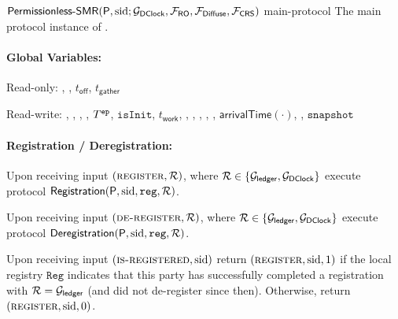 \begin{cccProtocol}
    {$\mathsf{Permissionless\text{-}SMR}(\mathsf{P}, \mathrm{sid}; \mathcal{G}_{\textsf{DClock}}, \mathcal{F}_{\textsf{RO}}, \mathcal{F}_{\textsf{Diffuse}}, \mathcal{F}_{\textsf{CRS}})$}
    {main-protocol}
    {The main protocol instance of \pSMR.}

    \paragraph{Global Variables:}
    \begin{cccItemize}[nosep]
        \item Read-only: \syncLen, \epochLen, $t_{\mathsf{off}}$, $t_{\mathsf{gather}}$

        \item Read-write: \localTime, \epoch, \parallelChainsLocal, \parallelTreesLocal, $T^{\mathtt{ep}}$, $\mathtt{isInit}$, $t_{\mathsf{work}}$, \buffer, , \futureChains, \isSync, \fetchCompleted, $\mathsf{arrivalTime}(\cdot)$, \state, $\mathtt{snapshot}$
    \end{cccItemize}

    \paragraph{Registration / Deregistration:}
    \begin{cccItemize}[nosep]
        \item Upon receiving input $(\textsc{register}, \mathcal{R})$, where $\mathcal{R} \in \{\mathcal{G}_{\textsf{ledger}}, \mathcal{G}_{\textsf{DClock}} \}$ execute protocol $\mathsf{Registration}(\mathsf{P},\allowbreak \mathrm{sid}, \mathtt{reg}, \mathcal{R})$.

        \item  Upon receiving input $(\textsc{de-register}, \mathcal{R})$, where $\mathcal{R} \in \{\mathcal{G}_{\textsf{ledger}}, \mathcal{G}_{\textsf{DClock}} \}$ execute protocol $\mathsf{Deregistration}(\mathsf{P}, \mathrm{sid},\allowbreak \mathtt{reg}, \mathcal{R})$.

        \item Upon receiving input $(\textsc{is-registered}, \mathrm{sid})$ return $(\textsc{register}, \mathrm{sid}, 1)$ if the local registry $\mathtt{Reg}$ indicates that this party has successfully completed a registration with $\mathcal{R} = \mathcal{G}_{\textsf{ledger}}$ (and did not de-register since then).
        Otherwise, return $(\textsc{register}, \mathrm{sid}, 0)$.
    \end{cccItemize}


\end{cccProtocol}
